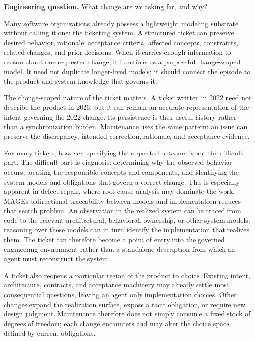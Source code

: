 

\textbf{Engineering question.} What change are we asking for, and why?

Many software organizations already possess a lightweight modeling substrate without calling it one: the ticketing system. A structured ticket can preserve desired behavior, rationale, acceptance criteria, affected concepts, constraints, related changes, and prior decisions. When it carries enough information to reason about one requested change, it functions as a purposeful change-scoped model. It need not duplicate longer-lived models; it should connect the episode to the product and system knowledge that governs it.

The change-scoped nature of the ticket matters. A ticket written in 2022 need not describe the product in 2026, but it can remain an accurate representation of the intent governing the 2022 change. Its persistence is then useful history rather than a synchronization burden. Maintenance uses the same pattern: an issue can preserve the discrepancy, intended correction, rationale, and acceptance evidence.

For many tickets, however, specifying the requested outcome is not the difficult part. The difficult part is diagnosis: determining why the observed behavior occurs, locating the responsible concepts and components, and identifying the system models and obligations that govern a correct change. This is especially apparent in defect repair, where root-cause analysis may dominate the work. MAGE\textquotesingle s bidirectional traceability between models and implementation reduces that search problem. An observation in the realized system can be traced from code to the relevant architectural, behavioral, ownership, or other system models; reasoning over those models can in turn identify the implementation that realizes them. The ticket can therefore become a point of entry into the governed engineering environment rather than a standalone description from which an agent must reconstruct the system.

A ticket also reopens a particular region of the product to choice. Existing intent, architecture, contracts, and acceptance machinery may already settle most consequential questions, leaving an agent only implementation choices. Other changes expand the realization surface, expose a tacit obligation, or require new design judgment. Maintenance therefore does not simply consume a fixed stock of degrees of freedom; each change encounters and may alter the choice space defined by current obligations.

